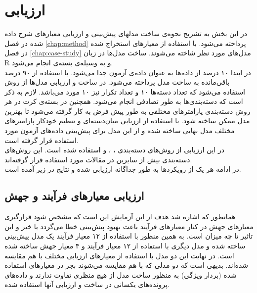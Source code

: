 \chapter{ارزیابی}
\label{chap:evaluation}
در این بخش به تشریح نحوه‌ی ساخت مدلهای پیش‌بینی و ارزیابی معیارهای شرح داده شده در فصل \ref{chap:method} پرداخته می‌شود. با استفاده از معیارهای استخراج شده در فصل \ref{chap:case-study} مدل‌های مورد نظر شاخته می‌شوند. ساخت مدل‌ها در زبان R و به وسیله‌ی بسته‌ی  \cite{kuhn2008caret} انجام می‌شود.\\
در ابتدا ۱۰ درصد از داده‌ها به عنوان داده‌ی آزمون جدا می‌شود. با استفاده از ۹۰ درصد باقی‌مانده به ساخت مدل پرداخته می‌شود. در ساخت و ارزیابی مدل‌ها از روش  استفاده می‌شود که تعداد دسته‌ها ۱۰ و تعداد تکرار نیز ۱۰ مورد می‌باشد. لازم به ذکر است که دسته‌بندی‌ها به طور تصادفی انجام می‌شود.  همچنین در بسته‌ی کرت در هر روش دسته‌بندی پارامترهای مختلفی به طور پیش فرض به کار گرفته می‌شود تا بهترین مدل ممکن ساخته شود.  با استفاده از ارزیابی میان‌دسته‌ای و تنظیم خودکار پارامترهای مختلف مدل نهایی ساخته شده و از این مدل برای پیش‌بینی داده‌های آزمون مورد استفاده قرار گرفته است.  \\
در این ارزیابی از  روش‌های دسته‌بندی 
 ،
 ،
 و
استفاده شده است. این روش‌های دسته‌بندی بیش از سایرین در مقالات مورد استفاده قرار گرفته‌اند. \\
در ادامه هر یک از رویکردها به طور جداگانه ارزیابی شده و نتایج در زیر آمده است. 


\section{ارزیابی معیارهای فرآیند و جهش}
همانطور که اشاره شد هدف از این آزمایش این است که مشخص شود قرارگیری معیارهای جهش در کنار معیارهای فرآیند باعث بهبود پیش‌بینی خطا می‌گردد یا خیر و این تاثیر تا چه میزان است. به همین منظور  با استفاده از ۱۲ معیار فرآیند یک مدل پیش‌بینی ساخته شده و مدل دیگری  با استفاده از ۱۲ معیار فرآیند و ۴ معیار جهش ساخته شده است. در نهایت این دو مدل با استفاده از معیارهای ارزیابی مختلف با هم مقایسه شده‌اند. بدیهی است که دو مدلی که با هم مقایسه می‌شوند بجر در معیارهای استفاده شده (بردار ویژگی) به منظور ساخت مدل از هیچ منظری تفاوت ندارند و داده‌های  پرونده‌های یکسانی در ساخت و ارزیابی آنها استفاده شده. \\


